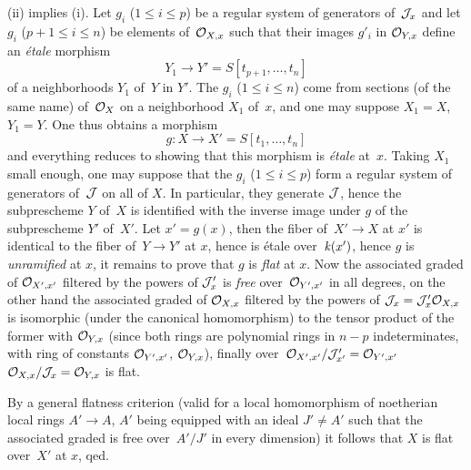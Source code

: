 (ii) implies (i). Let $g_i$ ($1 \leq i \leq p$) be a regular
system of generators of~$\cal{J}_x$ and let $g_i$
($p+1 \leq i \leq n$) be elements of~$\cal{O}_{X,x}$ such that
their images $g'_i$ in $\cal{O}_{Y,x}$ define an
\emph{\'etale} morphism
\[
Y_1 \to Y'=S[t_{p+1},\dots, t_n]
\]
of a neighborhoods $Y_1$ of~$Y$ in $Y'$. The $g_i$ ($1 \leq i \leq n$)
come from sections (of the same name) of~$\cal{O}_X$ on a
neighborhood $X_1$ of~$x$, and one may suppose $X_1=X$, $Y_1=Y$. One
thus obtains a morphism
\[
g\colon X \to X'=S[t_1,\dots,t_n]
\]
and everything reduces to showing that this morphism is \emph{\'etale}
at~$x$. Taking $X_1$ small enough,
one may suppose that the $g_i$ ($1 \leq i \leq p$) form a
regular system of generators of~$\cal{J}$ on all of
$X$. In particular, they generate $\cal{J}$, hence the
subprescheme $Y$ of~$X$ is identified with the inverse image
under $g$ of the subprescheme $Y'$ of~$X'$. Let $x'=g(x)$, then
the fiber of~$X' \to X$ at $x'$ is
identical to the fiber of~$Y \to Y'$ at $x$, hence is \'etale over~$\kres(x')$, hence $g$ is \emph{unramified} at $x$, it remains to
prove that $g$ is \emph{flat} at $x$. Now the associated graded
of $\cal{O}_{X',x'}$ filtered by the powers of
$\cal{J}'_{x}$ is \emph{free} over~$\cal{O}_{Y',x'}$ in all
degrees, on the other hand the associated graded of
$\cal{O}_{X,x}$ filtered by the powers of
$\cal{J}_x=\cal{J}'_x\cal{O}_{X,x}$ is isomorphic (under
the canonical homomorphism) to the tensor product of the former
with $\cal{O}_{Y,x}$ (since both rings are polynomial
rings in $n-p$ indeterminates, with ring of
constants $\cal{O}_{Y',x'}$, \resp $\cal{O}_{Y,x}$), finally over~$\cal{O}_{X',x'}/\cal{J}'_{x'}= \cal{O}_{Y',x'}$
$\cal{O}_{X,x}/\cal{J}_x =\cal{O}_{Y,x}$ is flat.

By a general flatness criterion (valid for
a local homomorphism of noetherian local rings $A' \to A$,
$A'$ being equipped with an ideal $J' \neq A'$ such that the associated
graded is free over~$A'/J'$ in every dimension) it follows that
$X$ is flat over~$X'$ at $x$, qed.

